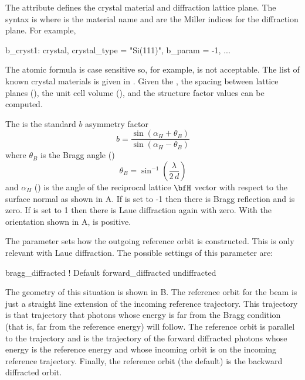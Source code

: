 The  attribute defines the crystal material and diffraction lattice plane. The
syntax is  where  is the material name and  are the Miller indices
for the diffraction plane. For example,
\begin{example}
  b_cryst1: crystal, crystal_type = "Si(111)", b_param = -1, ...
\end{example}
The atomic formula is case sensitive so, for example,  is not acceptable. The list of
known crystal materials is given in . Given the , the spacing
between lattice planes (), the unit cell volume (), and the structure
factor\cite{b:batterman} values can be computed.

The  is the standard $b$ asymmetry factor
\begin{equation}
  b = \frac{\sin(\alpha_H + \theta_B)}{\sin(\alpha_H - \theta_B)} 
  \label{batat}
\end{equation}
where $\theta_B$ is the Bragg angle () 
\begin{equation}
  \theta_B = \sin^{-1} \left( \frac{\lambda}{2 \, d} \right)
  \label{tsl2d}
\end{equation}
and $\alpha_H$ () is the angle of the reciprocal lattice $\bfH$ vector with respect
to the surface normal as shown in A.  If  is set to -1 then there is
Bragg reflection and  is zero. If  is set to 1 then there is Laue
diffraction again with  zero. With the orientation shown in A,
 is positive.


The  parameter sets how the outgoing reference orbit is constructed. This is
only relevant with Laue diffraction.  The possible settings of this parameter are:
\begin{example}
  bragg_diffracted      ! Default
  forward_diffracted
  undiffracted
\end{example}
The geometry of this situation is shown in B. The reference orbit for the
 beam is just a straight line extension of the incoming reference trajectory. This
trajectory is that trajectory that photons whose energy is far from the Bragg condition (that is,
far from the reference energy) will follow. The  reference orbit is parallel
to the  trajectory and is the trajectory of the forward diffracted photons whose
energy is the reference energy and whose incoming orbit is on the incoming reference trajectory.
Finally, the  reference orbit (the default) is the backward diffracted orbit.

